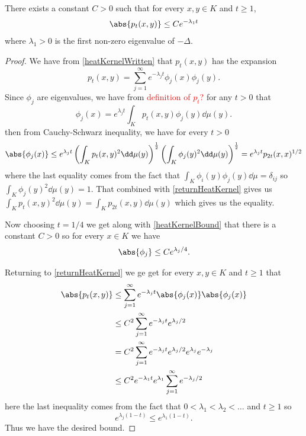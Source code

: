 \begin{lemma}\label{heatKernelBound2}
	There exists a constant $C> 0$ such that for every $x,y \in K$ and $t \geq 1$,
	\begin{equation}
		\abs{p_t(x,y)} \leq Ce^{-\lambda_1 t}
	\end{equation}
	where $\lambda_1 > 0$ is the first non-zero eigenvalue of $-\Delta$.
\end{lemma}
\begin{proof}
	We have from \cref{heatKernelWritten} that $p_t(x,y)$ has the expansion
	\begin{equation}\label{returnHeatKernel}
		p_t(x,y) = \sum_{j = 1}^{\infty} e^{-\lambda_j t}\phi_j(x)\phi_j(y).
	\end{equation}
	Since $\phi_j$ are eigenvalues, we have from \textcolor{red}{definition of $p_t$?} for any $t > 0$ that
	\begin{equation}
		\phi_j(x) = e^{\lambda_jt}\int_{K}p_t(x,y)\phi_j(y) \dd \mu (y).
	\end{equation}
	then from Cauchy-Schwarz inequality, we have for every $t > 0$ 
	\begin{equation}
		\abs{\phi_j(x)} \leq e^{\lambda_j t} \left(\int_{K} p_t(x,y)^{2} \dd \mu (y)\right)^{\frac{1}{2}}\left(\int_{K} \phi_j(y)^{2} \dd \mu (y)\right)^{\frac{1}{2}}  = e^{\lambda_j t}p_{2t}(x,x)^{1/2}
	\end{equation}
	where the last equality comes from the fact that $\int_{K}\phi_i(y)\phi_j(y) \dd \mu = \delta_{ij}$ so $\int_{K} \phi_j(y)^{2} \dd \mu (y) = 1$. That combined with \eqref{returnHeatKernel} gives us $\int_{K} p_t(x,y)^{2} \dd \mu (y) = \int_{K} p_{2t}(x,y) \dd \mu (y)$ which gives us the equality.
	
	Now choosing $t = 1/4$ we get along with \eqref{heatKernelBound} that there is a constant $C > 0$ so for every $x \in K$ we have
	\begin{equation}
		\abs{\phi_j} \leq C e^{\lambda_j/4}.
	\end{equation}
	
	Returning to \eqref{returnHeatKernel} we ge get for every $x, y \in K$ and $t \geq 1$ that
	\begin{align}
		\abs{p_t(x,y)} &\leq \sum_{j = 1}^{\infty} e^{-\lambda_jt} \abs{\phi_j(x)} \abs{\phi_j(x)} \\
		& \leq C^2 \sum_{j = 1}^{\infty} e^{-\lambda_jt} e^{\lambda_j/2} \\
		& = C^2 \sum_{j = 1}^{\infty} e^{-\lambda_jt} e^{\lambda_j/2} e^{\lambda_j}e^{-\lambda_j} \\
		&\leq C^2 e^{-\lambda_1 t}e^{\lambda_1}\sum_{j = 1}^{\infty} e^{-\lambda_j/2}
	\end{align}
	here the last inequality comes from the fact that $0 < \lambda_1 < \lambda_2 < \ldots$ and $t \geq 1$ so
	\begin{equation}
		e^{\lambda_j(1-t)} \leq e^{\lambda_1(1-t)}.
	\end{equation}
	Thus we have the desired bound.
\end{proof}

